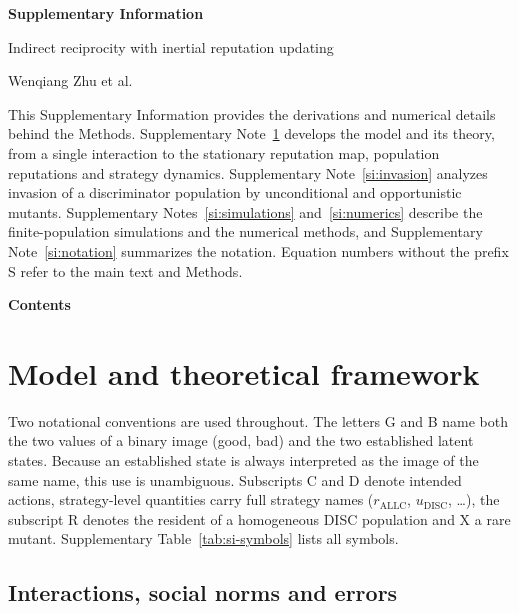 \documentclass[fleqn,10pt]{wlscirep}
\newif\ifdraftnotes
\DeclareRobustCommand{\draftnote}[1]{%
  \ifdraftnotes{\color{red!60!black}\sffamily\footnotesize[#1]}\fi}
\newcommand{\ALLC}{\mathrm{ALLC}}
\newcommand{\DISC}{\mathrm{DISC}}
\theoremstyle{plain}
\begin{document}
{\raggedright\sffamily\bfseries\fontsize{20}{25}\selectfont Supplementary Information\par}
\vskip6pt
{\raggedright\sffamily\fontsize{12}{16}\selectfont Indirect reciprocity with inertial reputation updating\par}
\vskip4pt
{\raggedright\sffamily\fontsize{11}{14}\selectfont Wenqiang Zhu et al.\par}
\vskip14pt

This Supplementary Information provides the derivations and numerical details behind the Methods. Supplementary Note~\ref{si:model} develops the model and its theory, from a single interaction to the stationary reputation map, population reputations and strategy dynamics. Supplementary Note~\ref{si:invasion} analyzes invasion of a discriminator population by unconditional and opportunistic mutants. Supplementary Notes~\ref{si:simulations} and~\ref{si:numerics} describe the finite-population simulations and the numerical methods, and Supplementary Note~\ref{si:notation} summarizes the notation. Equation numbers without the prefix S refer to the main text and Methods.
\draftnote{The Supplementary Information will be revised further.}

\startcontents[si]
\vskip10pt
{\sffamily\bfseries\large Contents\par}
\vskip4pt
\vskip12pt

\section{Model and theoretical framework}
\label{si:model}

Two notational conventions are used throughout. The letters G and B name both the two values of a binary image (good, bad) and the two established latent states. Because an established state is always interpreted as the image of the same name, this use is unambiguous. Subscripts C and D denote intended actions, strategy-level quantities carry full strategy names ($r_{\ALLC}$, $u_{\DISC}$, \ldots), the subscript R denotes the resident of a homogeneous DISC population and X a rare mutant. Supplementary Table~\ref{tab:si-symbols} lists all symbols.

\subsection{Interactions, social norms and errors}
\label{si:interactions}
\end{document}
